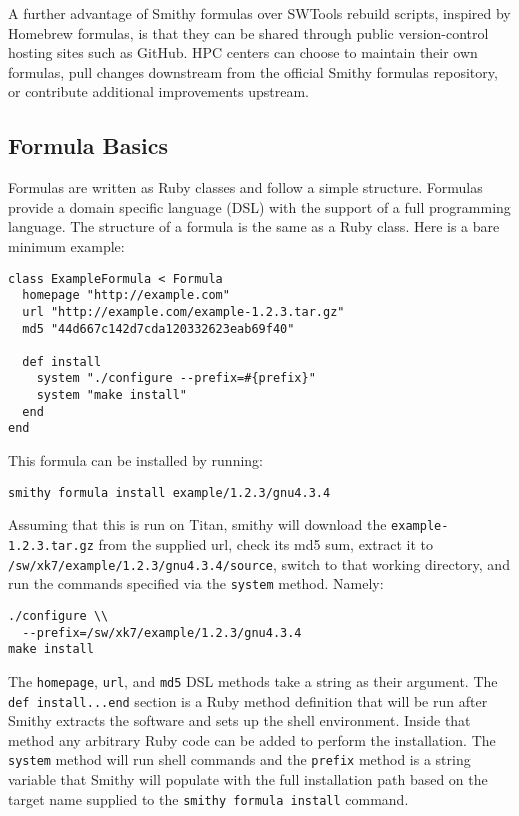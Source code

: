 \documentclass{acm_proc_article-sp}
\begin{document}
A further advantage of Smithy formulas over SWTools rebuild scripts, inspired by
Homebrew formulas, is that they can be shared through public version-control
hosting sites such as GitHub. HPC centers can choose to maintain their own
formulas, pull changes downstream from the official Smithy formulas repository,
or contribute additional improvements upstream.

\subsection{Formula Basics}

Formulas are written as Ruby classes and follow a simple structure.  Formulas
provide a domain specific language (DSL) with the support of a full programming
language. The structure of a formula is the same as a Ruby class. Here is a bare
minimum example:

\begin{quoting}
\begin{verbatim}
class ExampleFormula < Formula
  homepage "http://example.com"
  url "http://example.com/example-1.2.3.tar.gz"
  md5 "44d667c142d7cda120332623eab69f40"

  def install
    system "./configure --prefix=#{prefix}"
    system "make install"
  end
end
\end{verbatim}
\end{quoting}

This formula can be installed by running:

\begin{quoting}
\begin{verbatim}
smithy formula install example/1.2.3/gnu4.3.4
\end{verbatim}
\end{quoting}

Assuming that this is run on Titan, smithy will download the
\texttt{example-1.2.3.tar.gz} from the supplied url, check its md5 sum, extract
it to \texttt{/sw/xk7/example/1.2.3/gnu4.3.4/source}, switch to that working
directory, and run the commands specified via the \texttt{system} method.
Namely:

\begin{quoting}
\begin{verbatim}
./configure \\
  --prefix=/sw/xk7/example/1.2.3/gnu4.3.4
make install
\end{verbatim}
\end{quoting}

The \texttt{homepage}, \texttt{url}, and \texttt{md5} DSL methods take a string
as their argument. The \texttt{def install...end} section is a Ruby method
definition that will be run after Smithy extracts the software and sets up the
shell environment. Inside that method any arbitrary Ruby code can be added to
perform the installation. The \texttt{system} method will run shell commands and
the \texttt{prefix} method is a string variable that Smithy will populate with
the full installation path based on the target name supplied to the
\texttt{smithy formula install} command.
\end{document}
